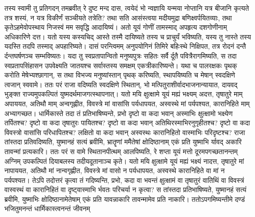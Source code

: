 \vakya तस्य स्वामी तु प्रतिगदन् तमब्रवीत् रे दुष्ट मन्द दास, त्वयेदं भो न्वज्ञायि यन्मया नोप्तानि यत्र बीजानि कृत्यते तत्र शस्यं, न यत्र विकीर्णं सञ्चीयते तत्रेति?
\vakya तथा सति आसंस्त्वया मदीयमुद्रा बणिक्ष्वर्पयितव्याः, तथा कृतेऽहमेवोपस्थाय निजस्वं मम सवृद्धि आदायिष्यं।
\vakya अतो यूयं गोणीं तामस्माद् अपहृत्य दशगोणीनाम् अधिकारिणे दत्त।
\vakya यतो यस्य कस्यचिद् आस्ते तस्मै दायिष्यते तस्य च प्राचुर्यं भविष्यति, यस्य तु नास्ते तस्य यदस्ति तदपि तस्माद् अपहारिष्यते।
\vakya दासं परन्त्विमम् अनुपयोगिनं तिमिरे बहिःस्थे निक्षिपत, तत्र रोदनं दन्तै र्दन्तघर्षणञ्च सम्भविष्यतः।
\vakya यदा तु स्वप्रतापान्वितो मनुष्यपुत्रः सहितः सर्वै र्दूतै पवित्रैरागमिष्यति,
\vakya स तदा स्वप्रतापसिंहासन उपवेक्ष्यति जातयश्च सर्वास्तस्य समक्षम् एकत्रीकारिष्यन्ते। यथा च पालरक्षकः पृथक् करोति मेषेभ्यश्छागान्, स तथा विभज्य मनुष्यांस्तान् पृथक् करिष्यति,
\vakya स्थापयिष्यति च मेषान् स्वदक्षिणे त्वजान् स्ववामे।
\vakya ततः परं राजा वदिष्यति स्वदक्षिणे स्थितान्, भो मत्पितुराशीर्वादभाजनान्यायात, दायवद् भुङ्क्त राज्यमुपकल्पितं युष्मदर्थमाजगत्स्थापनात्।
\vakya यतो मयि क्षुत्क्षामे यूयं मह्यं भक्ष्यम् अदत्त, तृषातुरे माम् अपाययत, अतिथौ माम् अन्वगृह्णीत,
\vakya विवस्त्रे मां वासांसि पर्यधापयत, अस्वस्थे मां पर्यपश्यत, कारानिहिते माम् अभ्यागच्छत।
\vakya धार्मिकास्ते तदा तं प्रतिभाषिष्यन्ते, प्रभो दृष्टो वा कदा भवान् अस्माभिः क्षुत्क्षामो भक्ष्येण तर्पितश्च? दृष्टो वा कदा तृषातुरः पायितश्च?
\vakya दृष्टो वा कदा भवान् अतिथिरस्माभिरनुगृहीतश्च? दृष्टो वा कदा विवस्त्रो वासांसि परिधापितश्च?
\vakya लक्षितो वा कदा भवान् अस्वस्थः कारानिहितो वास्माभिः परिदृष्टश्च?
\vakya राजा तांस्तदा प्रतिवदिष्यति, युष्मानहं सत्यं ब्रवीमि, भ्रातॄणां ममैतेषां क्षोदिष्ठानाम् एकं प्रति युष्माभि र्यावद् अकारि तावन्मां प्रत्यकारि।
\vakya ततः परं स वामे स्थितानपीत्थम् आलपिष्यति, रे शप्ता यूयं मत्तो दूरमपगच्छतानन्तम् अग्निम् उपकल्पितं दियाबलस्य तदीयदूतानाञ्च कृते।
\vakya यतो मयि क्षुत्क्षामे यूयं मह्यं भक्ष्यं नादत्त, तृषातुरे मां नापाययत,
\vakya अतिथौ मां नान्वगृह्णीत, विवस्त्रे मां वासो न पर्यधापयत, अस्वस्थे कारानिहिते वा मां न पर्यपश्यत।
\vakya तेऽपि तदोत्तरं कृत्वा तं गदिष्यन्ति, प्रभो, कदा वा भवन्तं क्षुत्क्षामं वा तृषातुरं वातिथिं वा विवस्त्रं वास्वस्थं वा कारानिहितं वा दृष्ट्वास्माभि र्भवतः परिचर्या न कृत्वा?
\vakya स तांस्तदा प्रतिभाषिष्यते, युष्मानहं सत्यं ब्रवीमि, युष्माभिः क्षोदिष्ठानामेतेषाम् एकं प्रति यावन्नाकारि तावन्मामेव प्रति नाकारि।
\vakya ततोऽपगमिष्यन्तीमे दण्डं भजितुमनन्तं धार्मिकास्त्वनन्तं जीवनम्\eoc